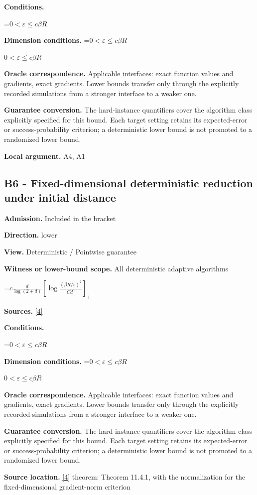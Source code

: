 \documentclass[10pt,a4paper]{article}
\newcommand{\AtlasMath}[1]{\par\begingroup\centering\setbox0=\hbox{$\displaystyle #1$}\ifdim\wd0>1.4\linewidth\typeout{ATLAS WIDE FORMULA: \the\wd0}\fi\ifdim\wd0>\linewidth\resizebox{\linewidth}{!}{\box0}\else\box0\fi\par\endgroup}
\newcommand{\AtlasInlineMath}[1]{\begingroup\setbox0=\hbox{$#1$}\ifdim\wd0>.4\linewidth\endgroup\AtlasMath{#1}\else\endgroup$#1$\fi}
\begin{document}
\textbf{Conditions.} 
\AtlasMath{0<\varepsilon\le c\beta R}


\textbf{Dimension conditions.} \AtlasInlineMath{0<\varepsilon\le c\beta R}

\textbf{Oracle correspondence.} Applicable interfaces: exact function values and gradients, exact gradients. Lower bounds transfer only through the explicitly recorded simulations from a stronger interface to a weaker one.

\textbf{Guarantee conversion.} The hard-instance quantifiers cover the algorithm class explicitly specified for this bound. Each target setting retains its expected-error or success-probability criterion; a deterministic lower bound is not promoted to a randomized lower bound.

\textbf{Local argument.} A4, A1

\subsection{B6 - Fixed-dimensional deterministic reduction under initial distance}
\textbf{Admission.} Included in the bracket

\textbf{Direction.} lower

\textbf{View.} Deterministic / Pointwise guarantee

\textbf{Witness or lower-bound scope.} All deterministic adaptive algorithms

\AtlasMath{c\frac d{\log(2+d)}\left[\log\frac{(\beta R/\varepsilon)^2}{Cd^{6}}\right]_+}
\textbf{Sources.} \href{https://www2.isye.gatech.edu/~nemirovs/LecEMCO.pdf}{[4]}

\textbf{Conditions.} 
\AtlasMath{0<\varepsilon\le c\beta R}


\textbf{Dimension conditions.} \AtlasInlineMath{0<\varepsilon\le c\beta R}

\textbf{Oracle correspondence.} Applicable interfaces: exact function values and gradients, exact gradients. Lower bounds transfer only through the explicitly recorded simulations from a stronger interface to a weaker one.

\textbf{Guarantee conversion.} The hard-instance quantifiers cover the algorithm class explicitly specified for this bound. Each target setting retains its expected-error or success-probability criterion; a deterministic lower bound is not promoted to a randomized lower bound.

\textbf{Source location.} \href{https://www2.isye.gatech.edu/~nemirovs/LecEMCO.pdf}{[4]} theorem: Theorem 11.4.1, with the normalization for the fixed-dimensional gradient-norm criterion
\end{document}
